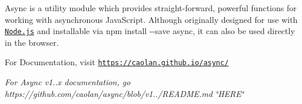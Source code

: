 

\href{https://travis-ci.org/caolan/async}{\tt } \href{https://www.npmjs.com/package/async}{\tt } \href{https://coveralls.io/r/caolan/async?branch=master}{\tt } \href{https://gitter.im/caolan/async?utm_source=badge&utm_medium=badge&utm_campaign=pr-badge&utm_content=badge}{\tt } \href{https://www.libhive.com/providers/npm/packages/async}{\tt }

Async is a utility module which provides straight-\/forward, powerful functions for working with asynchronous Java\+Script. Although originally designed for use with \href{https://nodejs.org/}{\tt Node.\+js} and installable via {\ttfamily npm install -\/-\/save async}, it can also be used directly in the browser.

For Documentation, visit \href{https://caolan.github.io/async/}{\tt https\+://caolan.\+github.\+io/async/}

{\itshape For Async v1..\+x documentation, go https\+://github.com/caolan/async/blob/v1../\+R\+E\+A\+D\+ME.md \char`\"{}\+H\+E\+R\+E\char`\"{}} 